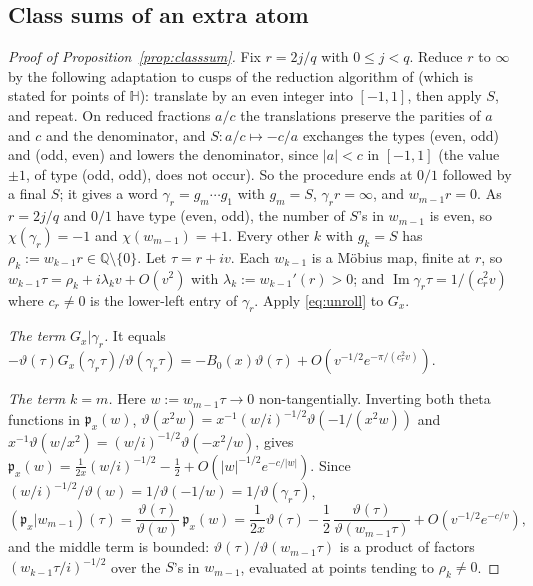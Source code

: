 \documentclass[11pt]{amsart}
\newcommand{\QQ}{\mathbb Q}
\renewcommand{\Im}{\operatorname{Im}}
\theoremstyle{definition}
\theoremstyle{remark}
\numberwithin{equation}{section}
\begin{document}
\subsection{Class sums of an extra atom}\label{app:proofs-classsum}
\begin{proof}[Proof of Proposition~\textup{\ref{prop:classsum}}]
Fix $r=2j/q$ with $0\le j<q$. Reduce $r$ to $\infty$ by the following adaptation to cusps of the reduction algorithm of
\cite[\S3.1]{BRS} (which is stated for points of $\mathbb H$): translate by an even integer into
$[-1,1]$, then apply $S$, and repeat. On reduced fractions $a/c$ the translations preserve the parities of $a$ and $c$ and the
denominator, and $S:a/c\mapsto-c/a$ exchanges the types (even, odd) and (odd, even) and lowers the denominator, since $|a|<c$ in
$[-1,1]$ (the value $\pm1$, of type (odd, odd), does not occur). So the procedure ends at $0/1$ followed by a final $S$; it gives a
word $\gamma_r=g_m\cdots g_1$ with $g_m=S$, $\gamma_r r=\infty$, and $w_{m-1}r=0$. As $r=2j/q$ and $0/1$ have type (even, odd), the number
of $S$'s in $w_{m-1}$ is even, so $\chi(\gamma_r)=-1$ and $\chi(w_{m-1})=+1$. Every other $k$ with $g_k=S$ has $\rho_k:=w_{k-1}r\in\QQ\setminus\{0\}$.
Let $\tau=r+iv$. Each $w_{k-1}$ is a M\"obius map, finite at $r$, so $w_{k-1}\tau=\rho_k+i\lambda_kv+O(v^2)$ with
$\lambda_k:=w_{k-1}'(r)>0$; and $\Im\gamma_r\tau=1/(c_r^2v)$ where $c_r\ne0$ is the lower-left entry of $\gamma_r$. Apply \eqref{eq:unroll} to $G_x$.

\emph{The term $G_x|\gamma_r$.} It equals $-\vartheta(\tau)G_x(\gamma_r\tau)/\vartheta(\gamma_r\tau)=-B_0(x)\vartheta(\tau)+O(v^{-1/2}e^{-\pi/(c_r^2v)})$.

\emph{The term $k=m$.} Here $w:=w_{m-1}\tau\to0$ non-tangentially. Inverting both theta functions in $\mathfrak p_x(w)$,
$\vartheta(x^2w)=x^{-1}(w/i)^{-1/2}\vartheta(-1/(x^2w))$ and $x^{-1}\vartheta(w/x^2)=(w/i)^{-1/2}\vartheta(-x^2/w)$, gives
$\mathfrak p_x(w)=\frac1{2x}(w/i)^{-1/2}-\frac12+O(|w|^{-1/2}e^{-c/|w|})$. Since $(w/i)^{-1/2}/\vartheta(w)=1/\vartheta(-1/w)=1/\vartheta(\gamma_r\tau)$,
\[
(\mathfrak p_x|w_{m-1})(\tau)=\frac{\vartheta(\tau)}{\vartheta(w)}\,\mathfrak p_x(w)=\frac1{2x}\vartheta(\tau)-\frac12\,\frac{\vartheta(\tau)}{\vartheta(w_{m-1}\tau)}+O(v^{-1/2}e^{-c/v}),
\]
and the middle term is bounded: $\vartheta(\tau)/\vartheta(w_{m-1}\tau)$ is a product of factors $(w_{k-1}\tau/i)^{-1/2}$ over the $S$'s in $w_{m-1}$,
evaluated at points tending to $\rho_k\ne0$.


\end{proof}
\end{document}

